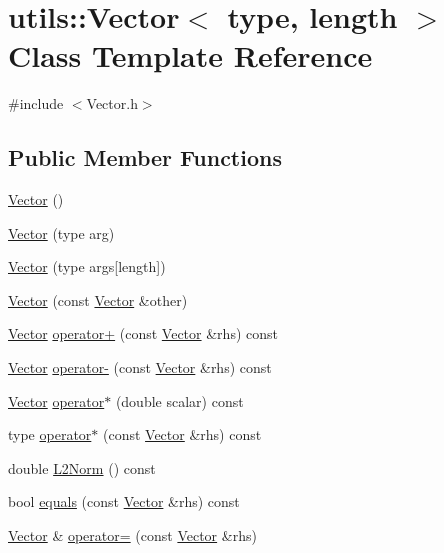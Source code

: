 \hypertarget{classutils_1_1Vector}{\section{utils\-:\-:Vector$<$ type, length $>$ Class Template Reference}
\label{classutils_1_1Vector}
}


{\ttfamily \#include $<$Vector.\-h$>$}

\subsection*{Public Member Functions}
\begin{DoxyCompactItemize}
\item 
\hyperlink{classutils_1_1Vector_a71b42b489a54eb7eae82cff54fae0e12}{Vector} ()
\item 
\hyperlink{classutils_1_1Vector_a5f7d3385f6db28e1376d16e46f1a485f}{Vector} (type arg)
\item 
\hyperlink{classutils_1_1Vector_a61a6f07c23829b70273ab4578bbb2332}{Vector} (type args\mbox{[}length\mbox{]})
\item 
\hyperlink{classutils_1_1Vector_abb684db142444c4b19e6cd854db1a0d8}{Vector} (const \hyperlink{classutils_1_1Vector}{Vector} \&other)
\item 
\hyperlink{classutils_1_1Vector}{Vector} \hyperlink{classutils_1_1Vector_aeb0edeaa6b74a48839892e16623b0949}{operator+} (const \hyperlink{classutils_1_1Vector}{Vector} \&rhs) const 
\item 
\hyperlink{classutils_1_1Vector}{Vector} \hyperlink{classutils_1_1Vector_ad6e42a80810a58993f39e1d876eb5716}{operator-\/} (const \hyperlink{classutils_1_1Vector}{Vector} \&rhs) const 
\item 
\hyperlink{classutils_1_1Vector}{Vector} \hyperlink{classutils_1_1Vector_a655ed48c281bfb1c87901313eb1896bb}{operator$\ast$} (double scalar) const 
\item 
type \hyperlink{classutils_1_1Vector_a306763bbaad613fd2f3387921d2c8698}{operator$\ast$} (const \hyperlink{classutils_1_1Vector}{Vector} \&rhs) const 
\item 
double \hyperlink{classutils_1_1Vector_aa54009b6a76a8059de0eccbe43524d0c}{L2\-Norm} () const 
\item 
bool \hyperlink{classutils_1_1Vector_a761ff3d4c09a533535452b2a20038782}{equals} (const \hyperlink{classutils_1_1Vector}{Vector} \&rhs) const 
\item 
\hyperlink{classutils_1_1Vector}{Vector} \& \hyperlink{classutils_1_1Vector_a16812f2bf90d9e79b58fd42860c111e7}{operator=} (const \hyperlink{classutils_1_1Vector}{Vector} \&rhs)

\end{DoxyCompactItemize}
